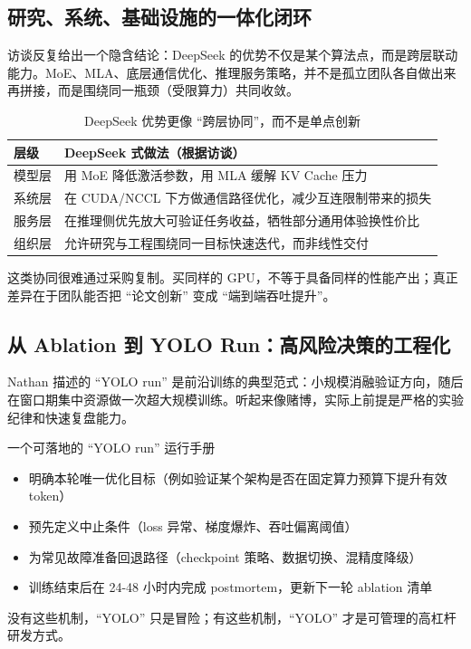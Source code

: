 \documentclass[a4paper]{article}
\begin{document}
\subsection{研究、系统、基础设施的一体化闭环}

访谈反复给出一个隐含结论：DeepSeek 的优势不仅是某个算法点，而是跨层联动能力。MoE、MLA、底层通信优化、推理服务策略，并不是孤立团队各自做出来再拼接，而是围绕同一瓶颈（受限算力）共同收敛。

\begin{table}[H]
\centering
\begin{tabular}{lp{8.5cm}}
\toprule
\textbf{层级} & \textbf{DeepSeek 式做法（根据访谈）} \\
\midrule
模型层 & 用 MoE 降低激活参数，用 MLA 缓解 KV Cache 压力 \\
系统层 & 在 CUDA/NCCL 下方做通信路径优化，减少互连限制带来的损失 \\
服务层 & 在推理侧优先放大可验证任务收益，牺牲部分通用体验换性价比 \\
组织层 & 允许研究与工程围绕同一目标快速迭代，而非线性交付 \\
\bottomrule
\end{tabular}
\caption{DeepSeek 优势更像 ``跨层协同''，而不是单点创新}
\end{table}

这类协同很难通过采购复制。买同样的 GPU，不等于具备同样的性能产出；真正差异在于团队能否把 ``论文创新'' 变成 ``端到端吞吐提升''。

\subsection{从 Ablation 到 YOLO Run：高风险决策的工程化}

Nathan 描述的 ``YOLO run'' 是前沿训练的典型范式：小规模消融验证方向，随后在窗口期集中资源做一次超大规模训练。听起来像赌博，实际上前提是严格的实验纪律和快速复盘能力。

\begin{knowledgebox}{一个可落地的 ``YOLO run'' 运行手册}
\begin{itemize}
    \item 明确本轮唯一优化目标（例如验证某个架构是否在固定算力预算下提升有效 token）
    \item 预先定义中止条件（loss 异常、梯度爆炸、吞吐偏离阈值）
    \item 为常见故障准备回退路径（checkpoint 策略、数据切换、混精度降级）
    \item 训练结束后在 24-48 小时内完成 postmortem，更新下一轮 ablation 清单
\end{itemize}

没有这些机制，``YOLO'' 只是冒险；有这些机制，``YOLO'' 才是可管理的高杠杆研发方式。
\end{knowledgebox}
\end{document}
